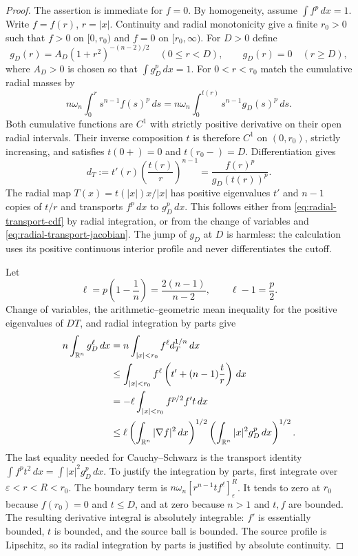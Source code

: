 \documentclass[11pt]{article}
\numberwithin{equation}{section}
\theoremstyle{definition}
\theoremstyle{remark}
\begin{document}
\begin{proof}
The assertion is immediate for $f=0$.  By homogeneity, assume
$\int f^p\,d x=1$.  Write $f=f(r)$, $r=|x|$.  Continuity and radial
monotonicity give a finite $r_0>0$ such that $f>0$ on $[0,r_0)$ and
$f=0$ on $[r_0,\infty)$.
For $D>0$ define
\[
 g_D(r)=A_D(1+r^2)^{-(n-2)/2}\quad(0\le r<D),
 \qquad g_D(r)=0\quad(r\ge D),
\]
where $A_D>0$ is chosen so that $\int g_D^p\,d x=1$.
For $0<r<r_0$ match the cumulative radial masses by
\begin{equation}
 n\omega_n\int_0^r s^{n-1}f(s)^p\,d s
   =n\omega_n\int_0^{t(r)}s^{n-1}g_D(s)^p\,d s.
 \label{eq:radial-transport-cdf}
\end{equation}
Both cumulative functions are $C^1$ with strictly positive derivative
on their open radial intervals.  Their inverse composition $t$ is
therefore $C^1$ on $(0,r_0)$, strictly increasing, and satisfies
$t(0+)=0$ and $t(r_0-)=D$.  Differentiation gives
\begin{equation}
 d_T:=t'(r)\left(\frac{t(r)}r\right)^{n-1}
      =\frac{f(r)^p}{g_D(t(r))^p}.
 \label{eq:radial-transport-jacobian}
\end{equation}
The radial map $T(x)=t(|x|)x/|x|$ has positive eigenvalues
$t'$ and $n-1$ copies of $t/r$ and transports $f^p\,d x$ to
$g_D^p\,d x$.  This follows either from
\eqref{eq:radial-transport-cdf} by radial integration, or from the
change of variables and \eqref{eq:radial-transport-jacobian}.
The jump of $g_D$ at $D$ is harmless: the calculation uses its
positive continuous interior profile and never differentiates the
cutoff.

Let
\[
 \ell=p\left(1-\frac1n\right)=\frac{2(n-1)}{n-2},
 \qquad \ell-1=\frac p2.
\]
Change of variables, the arithmetic--geometric mean inequality for
the positive eigenvalues of $DT$, and radial integration by parts
give
\begin{align}
 n\int_{\mathbb R^n}g_D^\ell\,d x
 &=n\int_{|x|<r_0}f^\ell d_T^{1/n}\,d x \notag\\
 &\le\int_{|x|<r_0}f^\ell
               \left(t'+(n-1)\frac tr\right)\,d x \notag\\
 &=-\ell\int_{|x|<r_0}f^{p/2}f't\,d x \notag\\
 &\le\ell\left(\int_{\mathbb R^n}|\nabla f|^2\,d x\right)^{1/2}
          \left(\int_{\mathbb R^n}|x|^2g_D^p\,d x\right)^{1/2}.
 \label{eq:radial-transport-estimate}
\end{align}
The last equality needed for Cauchy--Schwarz is the transport
identity $\int f^pt^2\,d x=\int|x|^2g_D^p\,d x$.
To justify the integration by parts, first integrate over
$\varepsilon<r<R<r_0$.  The boundary term is
$n\omega_n[r^{n-1}tf^\ell]_{\varepsilon}^R$.
It tends to zero at $r_0$ because $f(r_0)=0$ and $t\le D$, and at zero
because $n>1$ and $t,f$ are bounded.  The resulting derivative
integral is absolutely integrable: $f'$ is essentially bounded,
$t$ is bounded, and the source ball is bounded.  The source profile
is Lipschitz, so its radial integration by parts is justified by
absolute continuity.


\end{proof}
\end{document}
